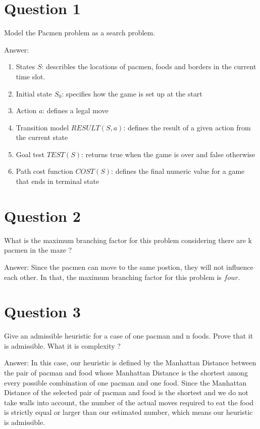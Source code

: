 \documentclass[12pt, a4paper]{report}
\begin{document}
\section{Question 1}
Model the Pacmen problem as a search problem.
\vspace{0.5 cm}
\par Answer:
\begin{enumerate}
    \item States $S$: describles the locations of pacmen, foods and borders in the current time slot.
    \item Initial state $S_0$: specifies how the game is set up at the start
    \item Action $a$: defines a legal move
    \item Transition model $RESULT(S, a)$: defines the result of a given action from the current state
    \item Goal test $TEST(S)$: returns true when the game is over and false otherwise
    \item Path cost function $COST(S)$: defines the final numeric value for a game that ends in terminal state
\end{enumerate}

\section{Question 2}
What is the maximum branching factor for this problem considering there are k pacmen in the maze ?
\vspace{0.5 cm}
\par Answer:
Since the pacmen can move to the same postion, they will not influence each other. In that, the maximum branching factor for this problem is $four$.

\section{Question 3}
Give an admissible heuristic for a case of one pacman and n foods. Prove that it is admissible. What it is complexity ?
\vspace{0.5 cm}
\par Answer:
In this case, our heuristic is defined by the Manhattan Distance between the pair of pacman and food whose Manhattan Distance is the shortest among every possible combination of one pacman and one food. Since the Manhattan Distance of the selected pair of pacman and food is the shortest and we do not take walls into account, the number of the actual moves required to eat the food is strictly equal or larger than our estimated number, which means our heuristic is admissible.
\end{document}
